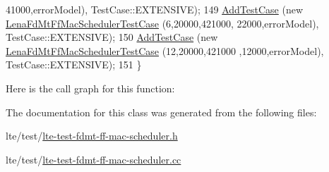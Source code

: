 \begin{DoxyCode}
      41000,errorModel), TestCase::EXTENSIVE);
149   \hyperlink{classns3_1_1TestCase_a3718088e3eefd5d6454569d2e0ddd835}{AddTestCase} (\textcolor{keyword}{new} \hyperlink{classLenaFdMtFfMacSchedulerTestCase}{LenaFdMtFfMacSchedulerTestCase} (6,20000,421000,
      22000,errorModel), TestCase::EXTENSIVE);
150   \hyperlink{classns3_1_1TestCase_a3718088e3eefd5d6454569d2e0ddd835}{AddTestCase} (\textcolor{keyword}{new} \hyperlink{classLenaFdMtFfMacSchedulerTestCase}{LenaFdMtFfMacSchedulerTestCase} (12,20000,421000
      ,12000,errorModel), TestCase::EXTENSIVE);
151 \}
\end{DoxyCode}


Here is the call graph for this function\+:




The documentation for this class was generated from the following files\+:\begin{DoxyCompactItemize}
\item 
lte/test/\hyperlink{lte-test-fdmt-ff-mac-scheduler_8h}{lte-\/test-\/fdmt-\/ff-\/mac-\/scheduler.\+h}\item 
lte/test/\hyperlink{lte-test-fdmt-ff-mac-scheduler_8cc}{lte-\/test-\/fdmt-\/ff-\/mac-\/scheduler.\+cc}\end{DoxyCompactItemize}

